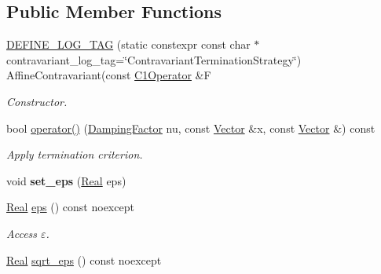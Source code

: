 \subsection*{Public Member Functions}
\begin{DoxyCompactItemize}
\item 
\hypertarget{classSpacy_1_1Newton_1_1Termination_1_1AffineContravariant_af1144cb538028260dabf1e482fa21096}{\hyperlink{classSpacy_1_1Newton_1_1Termination_1_1AffineContravariant_af1144cb538028260dabf1e482fa21096}{D\-E\-F\-I\-N\-E\-\_\-\-L\-O\-G\-\_\-\-T\-A\-G} (static constexpr const char $\ast$contravariant\-\_\-log\-\_\-tag=\char`\"{}Contravariant\-Termination\-Strategy\char`\"{}) Affine\-Contravariant(const \hyperlink{classSpacy_1_1C1Operator}{C1\-Operator} \&F}\label{classSpacy_1_1Newton_1_1Termination_1_1AffineContravariant_af1144cb538028260dabf1e482fa21096}

\begin{DoxyCompactList}\small\item\em Constructor. \end{DoxyCompactList}\item 
bool \hyperlink{classSpacy_1_1Newton_1_1Termination_1_1AffineContravariant_a16b9829fd882e948b5d273b80c549f4b}{operator()} (\hyperlink{classSpacy_1_1DampingFactor}{Damping\-Factor} nu, const \hyperlink{classSpacy_1_1Vector}{Vector} \&x, const \hyperlink{classSpacy_1_1Vector}{Vector} \&) const 
\begin{DoxyCompactList}\small\item\em Apply termination criterion. \end{DoxyCompactList}\item 
\hypertarget{classSpacy_1_1Mixin_1_1Eps_a818ab6dfab5e4eea583e1302bcc621f8}{void {\bfseries set\-\_\-eps} (\hyperlink{classSpacy_1_1Real}{Real} eps)}\label{classSpacy_1_1Mixin_1_1Eps_a818ab6dfab5e4eea583e1302bcc621f8}

\item 
\hypertarget{classSpacy_1_1Mixin_1_1Eps_a812b99b0abc1d78a34b4114907f23f52}{\hyperlink{classSpacy_1_1Real}{Real} \hyperlink{classSpacy_1_1Mixin_1_1Eps_a812b99b0abc1d78a34b4114907f23f52}{eps} () const noexcept}\label{classSpacy_1_1Mixin_1_1Eps_a812b99b0abc1d78a34b4114907f23f52}

\begin{DoxyCompactList}\small\item\em Access $\varepsilon$. \end{DoxyCompactList}\item 
\hypertarget{classSpacy_1_1Mixin_1_1Eps_a1c1b0ed7f14ed4967dc7da9295a136d4}{\hyperlink{classSpacy_1_1Real}{Real} \hyperlink{classSpacy_1_1Mixin_1_1Eps_a1c1b0ed7f14ed4967dc7da9295a136d4}{sqrt\-\_\-eps} () const noexcept}\label{classSpacy_1_1Mixin_1_1Eps_a1c1b0ed7f14ed4967dc7da9295a136d4}


\end{DoxyCompactItemize}

